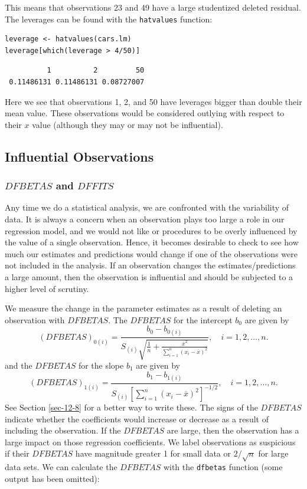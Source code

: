 \documentclass[captions=tableheading]{scrbook}
\begin{document}
This means that observations 23 and 49 have a large studentized deleted residual. The leverages can be found with the \texttt{hatvalues} function:


\lstset{language=R}
\begin{lstlisting}
leverage <- hatvalues(cars.lm)
leverage[which(leverage > 4/50)]
\end{lstlisting}

\begin{verbatim}
          1          2         50 
 0.11486131 0.11486131 0.08727007
\end{verbatim}

Here we see that observations 1, 2, and 50 have leverages bigger than double their mean value. These observations would be considered outlying with respect to their \(x\) value (although they may or may not be influential).
\subsection{Influential Observations}
\label{sec-11-5-4}
\subsubsection{\(DFBETAS\) and \(DFFITS\)}
\label{sec-11-5-4-1}


Any time we do a statistical analysis, we are confronted with the variability of data. It is always a concern when an observation plays too large a role in our regression model, and we would not like or procedures to be overly influenced by the value of a single observation. Hence, it becomes desirable to check to see how much our estimates and predictions would change if one of the observations were not included in the analysis. If an observation changes the estimates/predictions a large amount, then the observation is influential and should be subjected to a higher level of scrutiny.

We measure the change in the parameter estimates as a result of deleting an observation with \(DFBETAS\). The \(DFBETAS\) for the intercept \(b_{0}\) are given by
\begin{equation}
(DFBETAS)_{0(i)}=\frac{b_{0}-b_{0(i)}}{S_{(i)}\sqrt{\frac{1}{n}+\frac{\overline{x}^{2}}{\sum_{i=1}^{n}(x_{i}-\overline{x})^{2}}}},\quad i=1,2,\ldots,n.
\end{equation}
and the \(DFBETAS\) for the slope \(b_{1}\) are given by
\begin{equation}
(DFBETAS)_{1(i)}=\frac{b_{1}-b_{1(i)}}{S_{(i)}\left[\sum_{i=1}^{n}(x_{i}-\overline{x})^{2}\right]^{-1/2}},\quad i=1,2,\ldots,n.
\end{equation}
See Section \ref{sec-12-8} for a better way to write these. The signs of the \(DFBETAS\) indicate whether the coefficients would increase or decrease as a result of including the observation. If the \(DFBETAS\) are large, then the observation has a large impact on those regression coefficients. We label observations as suspicious if their \(DFBETAS\) have magnitude greater 1 for small data or \(2/\sqrt{n}\) for large data sets.
We can calculate the \(DFBETAS\) with the \texttt{dfbetas} function (some output has been omitted):
\end{document}
